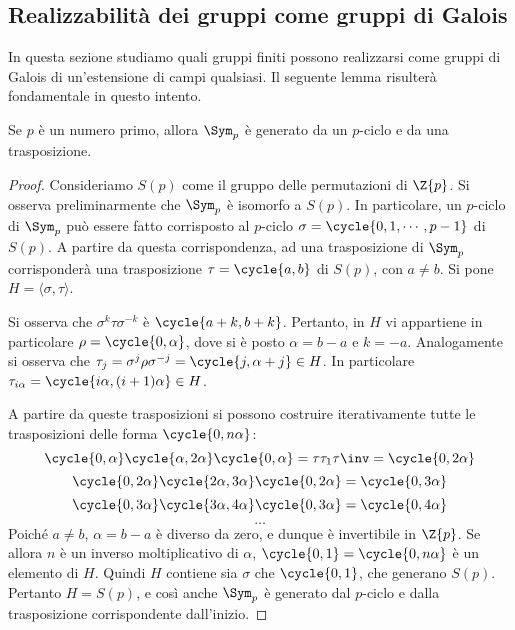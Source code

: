 \documentclass[11pt]{scrartcl}
\begin{document}
	\newpage
	
	\subsection{Realizzabilità dei gruppi come gruppi di Galois}
	
	In questa sezione studiamo quali gruppi finiti possono realizzarsi come gruppi di 
	Galois di un'estensione di campi qualsiasi. Il seguente lemma risulterà
	fondamentale in questo intento. 
	
	\begin{lemma}
		\label{lemma3.18}
		Se $p$ è un numero primo, allora $\Sym_p$ è generato da un $p$-ciclo e da una trasposizione.
	\end{lemma}
	
	\begin{proof}
		Consideriamo $S(p)$ come il gruppo delle permutazioni di $\Z{p}$. Si osserva preliminarmente
		che $\Sym_p$ è isomorfo a $S(p)$. In particolare, un $p$-ciclo di $\Sym_p$ può essere fatto
		corrisposto al $p$-ciclo $\sigma = \cycle{0, 1, \cdots, p-1}$
		di $S(p)$. A partire da questa corrispondenza, ad una trasposizione di $\Sym_p$ corrisponderà
		una trasposizione $\tau = \cycle{a, b}$ di $S(p)$, con $a \neq b$. Si pone $H = \langle \sigma, \tau \rangle$. \medskip
		
		
		Si osserva che $\sigma^k \tau \sigma^{-k}$ è $\cycle{a+k, b+k}$. Pertanto, in
		$H$ vi appartiene in particolare $\rho = \cycle{0, \alpha}$, dove si è posto
		$\alpha = b-a$ e $k = -a$.
		Analogamente si osserva che $\tau_j = \sigma^j \rho \sigma^{-j} = \cycle{j, \alpha + j} \in H$. In
		particolare $\tau_{i \alpha} = \cycle{i \alpha, (i+1) \alpha} \in H$. \medskip
		
		
		A partire da queste trasposizioni si possono costruire iterativamente tutte le trasposizioni
		delle forma $\cycle{0, n\alpha}$:
		\[
		\cycle{0, \alpha}\cycle{\alpha, 2\alpha}\cycle{0, \alpha} = \tau \tau_{1} \tau\inv = \cycle{0, 2\alpha}
		\]
		\[
		\cycle{0, 2\alpha}\cycle{2\alpha, 3\alpha}\cycle{0, 2\alpha} = \cycle{0, 3\alpha}
		\]
		\[
		\cycle{0, 3\alpha}\cycle{3\alpha, 4\alpha}\cycle{0, 3\alpha} = \cycle{0, 4\alpha}
		\]
		\[ \ldots \]
		 Poiché $a \neq b$, $\alpha = b - a$ è
		diverso da zero, e dunque è invertibile in $\Z{p}$. Se allora $n$ è un inverso moltiplicativo
		di $\alpha$, $\cycle{0, 1} = \cycle{0, n \alpha}$ è un elemento di $H$.
		Quindi $H$ contiene sia $\sigma$ che $\cycle{0, 1}$, che generano $S(p)$. Pertanto $H = S(p)$,
		e così anche $\Sym_p$ è generato dal $p$-ciclo e dalla trasposizione corrispondente dall'inizio.
	\end{proof}
	
\end{document}
